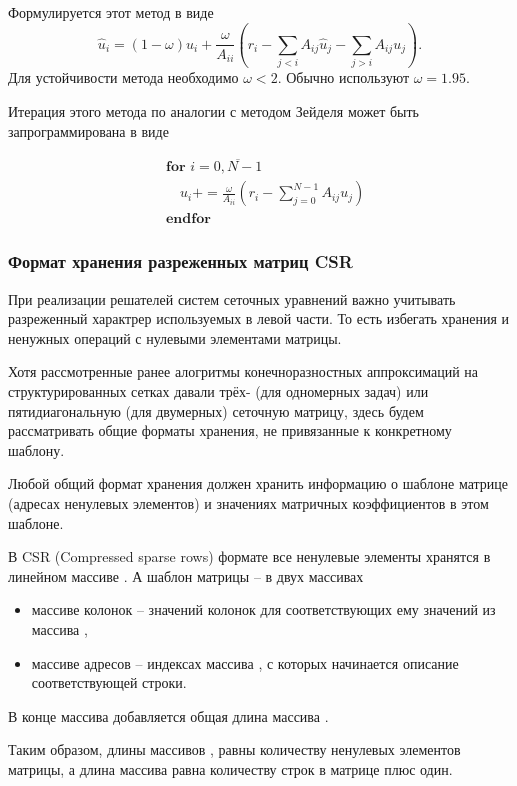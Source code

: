 Формулируется этот метод в виде
\begin{equation*}
    \hat u_i = (1-\omega) u_i + \frac{\omega}{A_{ii}}\left(r_i - \sum_{j<i} A_{ij}{\hat u_j} - \sum_{j>i} A_{ij}{u_j} \right).
\end{equation*}
Для устойчивости метода необходимо $\omega < 2$. Обычно используют $\omega=1.95$.

Итерация этого метода по аналогии с методом Зейделя может быть запрограммирована в виде

\begin{align*}
    &\textbf{for } i=\overline{0, N-1} \\ 
    &\quad u_i \mathrel{{+}{=}} \frac{\omega}{A_{ii}}\left(r_i - \sum_{j=0}^{N-1} A_{ij}{u_j}\right)\\
    &\textbf{endfor}
\end{align*}


\subsubsection{Формат хранения разреженных матриц CSR}
При реализации решателей систем сеточных уравнений важно учитывать
разреженный характрер используемых в левой части. То есть избегать
хранения и ненужных операций с нулевыми элементами матрицы.

Хотя рассмотренные ранее алогритмы конечноразностных аппроксимаций на структурированных сетках
давали трёх- (для одномерных задач) или пятидиагональную (для двумерных) сеточную матрицу,
здесь будем рассматривать общие форматы хранения, не привязанные к конкретному шаблону.

Любой общий
формат хранения должен хранить
информацию о шаблоне матрице (адресах ненулевых элементов)
и значениях матричных коэффициентов в этом шаблоне.

В CSR (Compressed sparse rows) формате
все ненулевые элементы хранятся в линейном массиве .
А шаблон матрицы -- в двух массивах
\begin{itemize}
	\item массиве колонок  -- значений колонок для соответствующих ему значений из массива ,
	\item массиве адресов  -- индексах массива , с которых начинается описание соответствующей строки.
\end{itemize}
В конце массива  добавляется общая длина массива .

Таким образом, длины массивов ,  равны количеству ненулевых элементов матрицы,
а длина массива  равна количеству строк в матрице плюс один.

